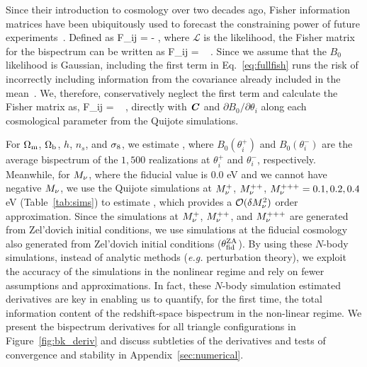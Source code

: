 Since their introduction to cosmology over two decades ago, Fisher information 
matrices have been ubiquitously used to forecast the constraining power of future 
experiments~\citep[\emph{e.g.}][]{jungman1996,tegmark1997,dodelson2003,heavens2009,verde2010}. 
Defined as 
\beq 
F_{ij} = - \bigg \langle {} \bigg \rangle,
\eeq
where $\mathcal{L}$ is the likelihood, the Fisher matrix for the bispectrum can 
be written as 
\beq \label{eq:fullfish} 
F_{ij} = ~ .
\eeq
Since we assume that the $B_0$ likelihood is Gaussian, including the first 
term in Eq.~\ref{eq:fullfish} runs the risk of incorrectly including information 
from the covariance already included in the mean~\citep{carron2013}. We, therefore,
conservatively neglect the first term and calculate the Fisher matrix as, 
\beq \label{eq:fisher}
F_{ij} = ~ ,
\eeq
directly with $\textbf{\textit{C}}$ and $\partial B_0/\partial \theta_i$ along each cosmological 
parameter from the Quijote simulations. 

For $\Omega_{\rm m}$, $\Omega_{\rm b}$, $h$, $n_s$, and $\sigma_8$, we estimate 
\beq \label{eq:dbkdt} 
 \approx {}, 
\eeq
where $B_0(\theta_i^{+})$ and $B_0(\theta_i^{-})$ are the average bispectrum of the 
$1,500$ realizations at $\theta_i^{+}$ and $\theta_i^{-}$, 
respectively. Meanwhile, for $M_\nu$, where the fiducial value is 0.0 eV and we 
cannot have negative $M_\nu$, we use the Quijote simulations at $M_\nu^+$, 
$M_\nu^{++}$, 
$M_\nu^{+++}=0.1, 0.2, 0.4$ eV (Table~\ref{tab:sims}) to estimate 
\beq \label{eq:dbkdmnu} 
 \approx {}, 
\eeq
which provides a $\mathcal{O}(\delta M_\nu^2)$ order approximation. 
Since the simulations at $M_\nu^+$, $M_\nu^{++}$, and $M_\nu^{+++}$ are generated 
from Zel'dovich initial conditions, we use simulations at the fiducial cosmology 
also generated from Zel'dovich initial conditions ($\theta_{\rm fid}^{\rm ZA}$). 
By using these $N$-body simulations, instead of analytic methods (\emph{e.g.} perturbation theory), 
we exploit the accuracy of the simulations in the nonlinear regime and rely on fewer 
assumptions and approximations. In fact, these $N$-body simulation estimated 
derivatives are key in enabling us to quantify, for the first time, the total information 
content of the redshift-space bispectrum in the non-linear regime. We present the 
bispectrum derivatives for all triangle configurations in Figure~\ref{fig:bk_deriv} and  
discuss subtleties of the derivatives and tests of convergence and stability 
in Appendix~\ref{sec:numerical}. 


